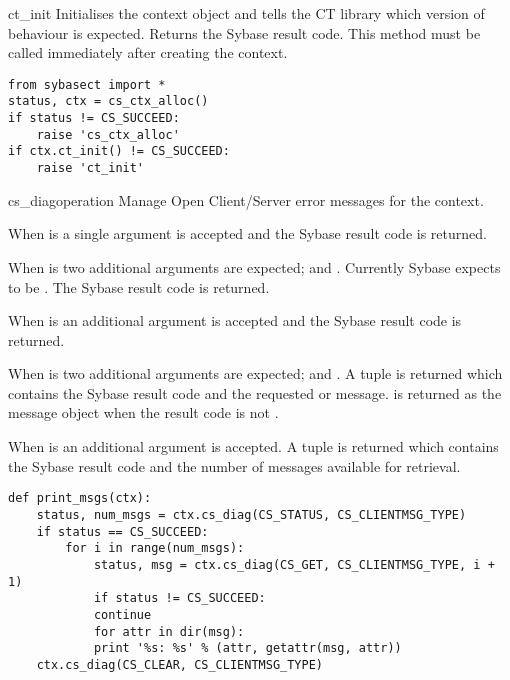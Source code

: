\begin{methoddesc}[CS_CONTEXT]{ct_init}{}
Initialises the context object and tells the CT library which version
of behaviour is expected.  Returns the Sybase result code.  This
method must be called immediately after creating the context.

\begin{verbatim}
from sybasect import *
status, ctx = cs_ctx_alloc()
if status != CS_SUCCEED:
    raise 'cs_ctx_alloc'
if ctx.ct_init() != CS_SUCCEED:
    raise 'ct_init'
\end{verbatim}
\end{methoddesc}

\begin{methoddesc}[CS_CONTEXT]{cs_diag}{operation \optional{, \ldots}}
Manage Open Client/Server error messages for the context.

When  is  a single argument is accepted
and the Sybase result code is returned.

When  is  two additional arguments
are expected;  and .  Currently Sybase expects
 to be .  The Sybase result code is
returned.

When  is  an additional 
argument is accepted and the Sybase result code is returned.

When  is  two additional arguments are
expected;  and .  A tuple is returned which
contains the Sybase result code and the requested 
or  message.   is returned as the
message object when the result code is not .

When  is  an additional 
argument is accepted.  A tuple is returned which contains the Sybase
result code and the number of messages available for retrieval.

\begin{verbatim}
def print_msgs(ctx):
    status, num_msgs = ctx.cs_diag(CS_STATUS, CS_CLIENTMSG_TYPE)
    if status == CS_SUCCEED:
    	for i in range(num_msgs):
    	    status, msg = ctx.cs_diag(CS_GET, CS_CLIENTMSG_TYPE, i + 1)
    	    if status != CS_SUCCEED:
    		continue
    	    for attr in dir(msg):
    		print '%s: %s' % (attr, getattr(msg, attr))
    ctx.cs_diag(CS_CLEAR, CS_CLIENTMSG_TYPE)
\end{verbatim}
\end{methoddesc}

